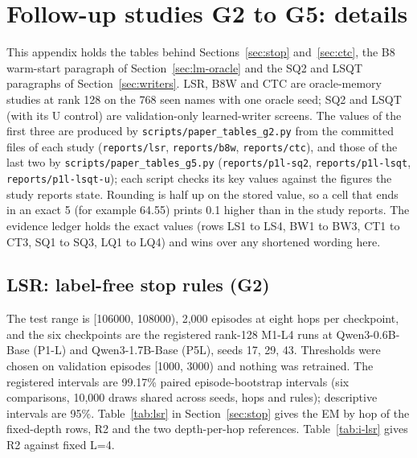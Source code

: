 \section{Follow-up studies G2 to G5: details}\label{app:I}

This appendix holds the tables behind Sections~\ref{sec:stop} and~\ref{sec:ctc}, the B8 warm-start paragraph of Section~\ref{sec:lm-oracle} and the SQ2 and LSQT paragraphs of Section~\ref{sec:writers}.
LSR, B8W and CTC are oracle-memory studies at rank 128 on the 768 seen names with one oracle seed; SQ2 and LSQT (with its U control) are validation-only learned-writer screens.
The values of the first three are produced by \texttt{scripts/paper\_tables\_g2.py} from the committed files of each study (\texttt{reports/lsr}, \texttt{reports/b8w}, \texttt{reports/ctc}), and those of the last two by \texttt{scripts/paper\_tables\_g5.py} (\texttt{reports/p1l-sq2}, \texttt{reports/p1l-lsqt}, \texttt{reports/p1l-lsqt-u}); each script checks its key values against the figures the study reports state.
Rounding is half up on the stored value, so a cell that ends in an exact 5 (for example 64.55) prints 0.1 higher than in the study reports.
The evidence ledger holds the exact values (rows LS1 to LS4, BW1 to BW3, CT1 to CT3, SQ1 to SQ3, LQ1 to LQ4) and wins over any shortened wording here.

\subsection{LSR: label-free stop rules (G2)}

The test range is [106000, 108000), 2,000 episodes at eight hops per checkpoint, and the six checkpoints are the registered rank-128 M1-L4 runs at Qwen3-0.6B-Base (P1-L) and Qwen3-1.7B-Base (P5L), seeds 17, 29, 43.
Thresholds were chosen on validation episodes [1000, 3000) and nothing was retrained.
The registered intervals are 99.17\% paired episode-bootstrap intervals (six comparisons, 10,000 draws shared across seeds, hops and rules); descriptive intervals are 95\%.  %
Table~\ref{tab:lsr} in Section~\ref{sec:stop} gives the EM by hop of the fixed-depth rows, R2 and the two depth-per-hop references.
Table~\ref{tab:i-lsr} gives R2 against fixed L=4.

